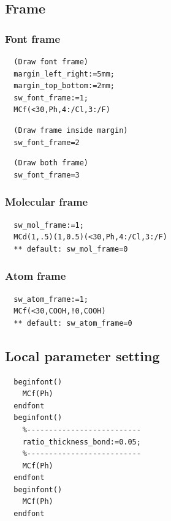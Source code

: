 \documentclass[a4paper]{article}
\makeatletter
\def\MCFstructure{\hspace{5mm}{\@strufont\char\fontnum}\advance\fontnum\@ne\relax}%
\makeatother
\begin{document}
\subsection{Frame}
\subsubsection{Font frame}
\begin{verbatim}
  (Draw font frame)
  margin_left_right:=5mm;
  margin_top_bottom:=2mm;
  sw_font_frame:=1;
  MCf(<30,Ph,4:/Cl,3:/F)
\end{verbatim}
\MCFstructure
\begin{verbatim}
  (Draw frame inside margin)
  sw_font_frame=2
\end{verbatim}
\MCFstructure
\begin{verbatim}
  (Draw both frame)
  sw_font_frame=3
\end{verbatim}
\MCFstructure
\subsubsection{Molecular frame}
\begin{verbatim}
  sw_mol_frame:=1;
  MCd(1,.5)(1,0.5)(<30,Ph,4:/Cl,3:/F)
  ** default: sw_mol_frame=0
\end{verbatim}
\MCFstructure
\subsubsection{Atom frame}
\begin{verbatim}
  sw_atom_frame:=1;
  MCf(<30,COOH,!0,COOH)
  ** default: sw_atom_frame=0
\end{verbatim}
\MCFstructure
\subsection{Local parameter setting}
\begin{verbatim}
  beginfont()
    MCf(Ph)
  endfont
  beginfont()
    %--------------------------
    ratio_thickness_bond:=0.05;
    %--------------------------
    MCf(Ph)
  endfont
  beginfont()
    MCf(Ph)
  endfont
\end{verbatim}
\MCFstructure\MCFstructure\MCFstructure
\end{document}
